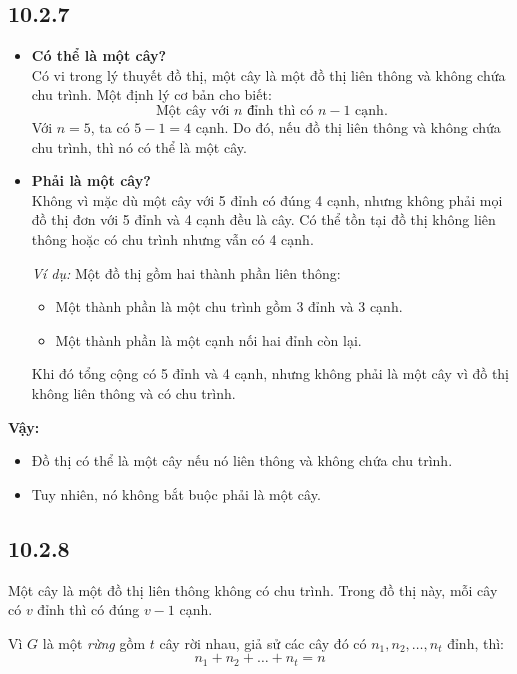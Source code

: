 \documentclass{article}
\begin{document}
	\subsection*{10.2.7}
	\begin{itemize}
		\item \textbf{Có thể là một cây?} \\
		Có vi trong lý thuyết đồ thị, một cây là một đồ thị liên thông và không chứa chu trình. Một định lý cơ bản cho biết:
		\[
		\text{Một cây với } n \text{ đỉnh thì có } n - 1 \text{ cạnh}.
		\]
		Với $n = 5$, ta có $5 - 1 = 4$ cạnh. Do đó, nếu đồ thị liên thông và không chứa chu trình, thì nó có thể là một cây.
		
		\item \textbf{Phải là một cây?} \\
		Không vì mặc dù một cây với 5 đỉnh có đúng 4 cạnh, nhưng không phải mọi đồ thị đơn với 5 đỉnh và 4 cạnh đều là cây. Có thể tồn tại đồ thị không liên thông hoặc có chu trình nhưng vẫn có 4 cạnh.
		
		\textit{Ví dụ:} Một đồ thị gồm hai thành phần liên thông:
		\begin{itemize}
			\item Một thành phần là một chu trình gồm 3 đỉnh và 3 cạnh.
			\item Một thành phần là một cạnh nối hai đỉnh còn lại.
		\end{itemize}
		Khi đó tổng cộng có 5 đỉnh và 4 cạnh, nhưng không phải là một cây vì đồ thị không liên thông và có chu trình.
		
	\end{itemize}
	
	\vspace{1em}
	\noindent \textbf{Vậy:}
	\begin{itemize}
		\item Đồ thị có thể là một cây nếu nó liên thông và không chứa chu trình.
		\item Tuy nhiên, nó không bắt buộc phải là một cây.
	\end{itemize}
	
	\subsection*{10.2.8}
	Một cây là một đồ thị liên thông không có chu trình. Trong đồ thị này, mỗi cây có $v$ đỉnh thì có đúng $v - 1$ cạnh.
	
	Vì $G$ là một \textit{rừng} gồm $t$ cây rời nhau, giả sử các cây đó có $n_1, n_2, \dots, n_t$ đỉnh, thì:
	\[
	n_1 + n_2 + \dots + n_t = n
	\]
	
\end{document}
